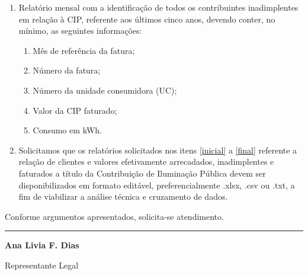 \documentclass[11pt,a4paper]{article}
\begin{document}
\begin{enumerate}[resume]
\begin{enumerate}
  \item Número da unidade consumidora (UC);
  \item Valor arrecadado;
  \item Data da arrecadação.
\end{enumerate}
\item Relatório mensal com a identificação de todos os contribuintes inadimplentes em relação à CIP, referente aos últimos cinco anos, devendo conter, no mínimo, as seguintes informações:
\label{final}
\begin{enumerate}
  \item Mês de referência da fatura;
  \item Número da fatura;
  \item Número da unidade consumidora (UC);
  \item Valor da CIP faturado;
  \item Consumo em kWh.
\end{enumerate}
\item Solicitamos que os relatórios solicitados nos itens \ref{inicial} a \ref{final} referente a relação de clientes e valores efetivamente arrecadados, inadimplentes e faturados a título da Contribuição de Iluminação Pública devem ser disponibilizados em formato editável, preferencialmente .xlsx, .csv ou .txt, a fim de viabilizar a análise técnica e cruzamento de dados.


\end{enumerate}

Conforme argumentos apresentados, solicita-se atendimento.

\vspace{2cm}
\begin{center}
\noindent\rule{6cm}{0.4pt}

\textbf{Ana Livia F. Dias}

{\small Representante Legal}
\end{center}
\end{document}
